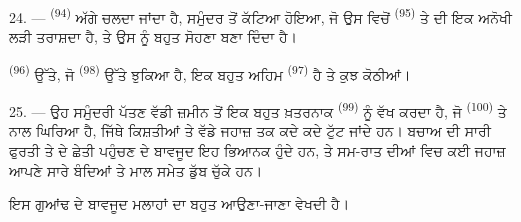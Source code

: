 \VUsaut{3.0mm}
\VUsaut{3.0mm}

24. ---  \textsuperscript{(94)} ਅੱਗੇ ਚਲਦਾ ਜਾਂਦਾ ਹੈ, ਸਮੁੰਦਰ ਤੋਂ ਕੱਟਿਆ
ਹੋਇਆ, ਜੋ ਉਸ ਵਿਚੋਂ  \textsuperscript{(95)} ਤੇ  ਦੀ
ਇਕ ਅਨੋਖੀ ਲੜੀ ਤਰਾਸ਼ਦਾ ਹੈ, ਤੇ ਉਸ ਨੂੰ ਬਹੁਤ ਸੋਹਣਾ ਬਣਾ ਦਿੰਦਾ ਹੈ।

 \textsuperscript{(96)} ਉੱਤੇ, ਜੋ 
\textsuperscript{(98)} ਉੱਤੇ ਝੁਕਿਆ ਹੈ, ਇਕ ਬਹੁਤ ਅਹਿਮ 
\textsuperscript{(97)} ਹੈ ਤੇ ਕੁਝ ਕੋਠੀਆਂ।

25. --- ਉਹ ਸਮੁੰਦਰੀ ਪੱਤਣ ਵੱਡੀ ਜ਼ਮੀਨ ਤੋਂ ਇਕ ਬਹੁਤ ਖ਼ਤਰਨਾਕ 
\textsuperscript{(99)} ਨੂੰ ਵੱਖ ਕਰਦਾ ਹੈ, ਜੋ  \textsuperscript{(100)}
ਤੇ  ਨਾਲ ਘਿਰਿਆ ਹੈ, ਜਿੱਥੇ ਕਿਸ਼ਤੀਆਂ ਤੇ ਵੱਡੇ ਜਹਾਜ਼ ਤਕ ਕਦੇ ਕਦੇ ਟੁੱਟ
ਜਾਂਦੇ ਹਨ। ਬਚਾਅ ਦੀ ਸਾਰੀ ਫੁਰਤੀ ਤੇ  ਦੇ ਛੇਤੀ ਪਹੁੰਚਣ ਦੇ
ਬਾਵਜੂਦ ਇਹ  ਭਿਆਨਕ ਹੁੰਦੇ ਹਨ, ਤੇ ਸਮ-ਰਾਤ ਦੀਆਂ 
ਵਿਚ ਕਈ ਜਹਾਜ਼ ਆਪਣੇ ਸਾਰੇ ਬੰਦਿਆਂ ਤੇ ਮਾਲ ਸਮੇਤ ਡੁੱਬ ਚੁੱਕੇ ਹਨ।

ਇਸ ਗੁਆਂਢ ਦੇ ਬਾਵਜੂਦ  ਮਲਾਹਾਂ ਦਾ ਬਹੁਤ ਆਉਣਾ-ਜਾਣਾ ਵੇਖਦੀ ਹੈ।
\VUsaut{6.0mm}
\VUfilet{22mm}
